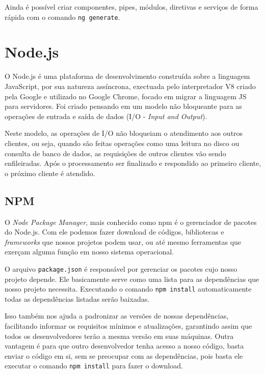 \documentclass[
	12pt,				%
	openright,			%
	twoside,			%
	a4paper,			%
	english,			%
	brazil				%
	]{abntex2}
\begin{document}
Ainda é possível criar componentes, pipes, módulos, diretivas e serviços de forma rápida com o comando \verb|ng generate|.

\section{Node.js}

O Node.js é uma plataforma de desenvolvimento construída sobre a linguagem JavaScript, por sua natureza assíncrona, exectuada pelo interpretador V8 criado pela Google e utilizado no Google Chrome, focado em migrar a linguagem JS para servidores. Foi criado pensando em um modelo não bloqueante para as operações de entrada e saída de dados (I/O - \textit{Input and Output}).

Neste modelo, as operações de I/O não bloqueiam o atendimento aos outros clientes, ou seja, quando são feitas operações como uma leitura no disco ou consulta de banco de dados, as requisições de outros clientes vão sendo enfileiradas. Após o processamento ser finalizado e respondido ao primeiro cliente, o próximo cliente é atendido.

\subsection{NPM}

O \textit{Node Package Manager}, mais conhecido como npm é o gerenciador de pacotes do Node.js. Com ele podemos fazer download de códigos, bibliotecas e \textit{frameworks} que nossos projetos podem usar, ou até mesmo ferramentas que exerçam alguma função em nosso sistema operacional.

O arquivo \verb|package.json| é responsável por gerenciar os pacotes cujo nosso projeto depende. Ele basicamente serve como uma lista para as dependências que nosso projeto necessita. Executando o comando \verb|npm install| automaticamente todas as dependências listadas serão baixadas.

Isso também nos ajuda a padronizar as versões de nossas dependências, facilitando informar os requisitos mínimos e atualizações, garantindo assim que todos os desenvolvedores terão a mesma versão em suas máquinas. Outra vantagem é para que outro desenvolvedor tenha acesso a nosso código, basta enviar o código em si, sem se preocupar com as dependências, pois basta ele executar o comando \verb|npm install| para fazer o download. 


\end{document}
